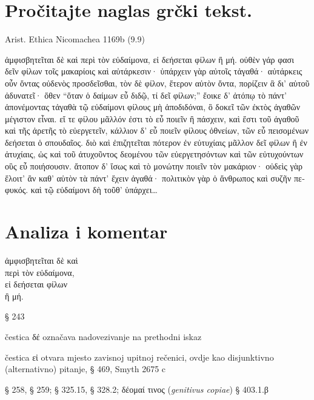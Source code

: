 
\section*{Pročitajte naglas grčki tekst.}

Arist. Ethica Nicomachea 1169b (9.9)


\medskip


{\large

\begin{greek}

\noindent  ἀμφισβητεῖται δὲ καὶ περὶ τὸν εὐδαίμονα, εἰ δεήσεται φίλων ἢ μή. οὐθὲν γάρ φασι δεῖν φίλων τοῖς μακαρίοις καὶ αὐτάρκεσιν· ὑπάρχειν γὰρ αὐτοῖς τἀγαθά· αὐτάρκεις οὖν ὄντας οὐδενὸς προσδεῖσθαι, τὸν δὲ φίλον, ἕτερον αὐτὸν ὄντα, πορίζειν ἃ δι' αὑτοῦ ἀδυνατεῖ· ὅθεν ``ὅταν ὁ δαίμων εὖ διδῷ, τί δεῖ φίλων;'' ἔοικε δ' ἀτόπῳ τὸ πάντ' ἀπονέμοντας τἀγαθὰ τῷ εὐδαίμονι φίλους μὴ ἀποδιδόναι, ὃ δοκεῖ τῶν ἐκτὸς ἀγαθῶν μέγιστον εἶναι. εἴ τε φίλου μᾶλλόν ἐστι τὸ εὖ ποιεῖν ἢ πάσχειν, καὶ ἔστι τοῦ ἀγαθοῦ καὶ τῆς ἀρετῆς τὸ εὐεργετεῖν, κάλλιον δ' εὖ ποιεῖν φίλους ὀθνείων, τῶν εὖ πεισομένων δεήσεται ὁ σπουδαῖος. διὸ καὶ ἐπιζητεῖται πότερον ἐν εὐτυχίαις μᾶλλον δεῖ φίλων ἢ ἐν ἀτυχίαις, ὡς καὶ τοῦ ἀτυχοῦντος δεομένου τῶν εὐεργετησόντων καὶ τῶν εὐτυχούντων οὓς εὖ ποιήσουσιν. ἄτοπον δ' ἴσως καὶ τὸ μονώτην ποιεῖν τὸν μακάριον· οὐδεὶς γὰρ ἕλοιτ' ἂν καθ' αὑτὸν τὰ πάντ' ἔχειν ἀγαθά· πολιτικὸν γὰρ ὁ ἄνθρωπος καὶ συζῆν πεφυκός. καὶ τῷ εὐδαίμονι δὴ τοῦθ' ὑπάρχει\dots

\end{greek}

}


\section*{Analiza i komentar}


{\large
\begin{greek}
\noindent  ἀμφισβητεῖται δὲ καὶ \\
\tabto{2em} περὶ τὸν εὐδαίμονα, \\
εἰ δεήσεται φίλων \\
\tabto{2em} ἢ μή.\\

\end{greek}
}

\begin{description}[noitemsep]
\item[ἀμφισβητεῖται] § 243
\item[δὲ] čestica δέ označava nadovezivanje na prethodni iskaz
\item[εἰ\dots\ ἢ μή] čestica εἰ otvara mjesto zavisnoj upitnoj rečenici, ovdje kao disjunktivno (alternativno) pitanje, § 469, Smyth 2675 c
\item[δεήσεται] § 258, § 259; § 325.15, § 328.2; δέομαί τινος (\textit{genitivus copiae}) § 403.1.β

\end{description}

